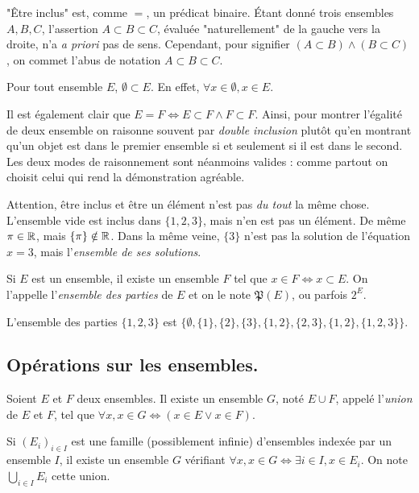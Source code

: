 "\^Etre inclus" est, comme $=$, un prédicat binaire. Étant donné trois ensembles $A, B, C$, l'assertion $A \subset B \subset C$, évaluée "naturellement" de la gauche vers la droite, n'a \emph{a priori} pas de sens. Cependant, pour signifier $(A \subset B)\wedge(B \subset C)$, on commet l'abus de notation $A \subset B \subset C$.

\begin{lined}
    Pour tout ensemble $E$, $\emptyset \subset E$. En effet, $\forall x \in \emptyset, x\in E$.
\end{lined}

Il est également clair que $E = F \Leftrightarrow E \subset F \wedge F \subset F$. Ainsi, pour montrer l'égalité de deux ensemble on raisonne souvent par  \emph{double inclusion} plutôt qu'en montrant qu'un objet est dans le premier ensemble si et seulement si il est dans le second. Les deux modes de raisonnement sont néanmoins valides : comme partout on choisit celui qui rend la démonstration agréable.

\begin{rlined}
    Attention, être inclus et être un élément n'est pas \emph{du tout} la même chose. L'ensemble vide est inclus dans $\{1, 2, 3\}$, mais n'en est pas un élément. De même $\pi \in \mathbb{R}$, mais $\{\pi\} \notin \mathbb{R}$. Dans la même veine, $\{3\}$ n'est pas la solution de l'équation $x = 3$, mais l'\emph{ensemble de ses solutions}.
\end{rlined}

\begin{ax}
    Si $E$ est un ensemble, il existe un ensemble $F$ tel que $x \in F \Leftrightarrow x \subset E$. On l'appelle l'\emph{ensemble des parties} de $E$ et on le note $\mathfrak{P}(E)$, ou parfois $2^E$.
\end{ax}

\begin{lined}
    L'ensemble des parties $\{1, 2, 3\}$ est $\{\emptyset, \{1\}, \{2\}, \{3\}, \{1, 2\}, \{2, 3\}, \{1, 2\}, \{1, 2, 3\}\}$.
\end{lined}

\subsection{Opérations sur les ensembles.}

\begin{dftn}
    Soient $E$ et $F$ deux ensembles. Il existe un ensemble $G$, noté $E \cup F$, appelé l'\emph{union} de $E$ et $F$, tel que $\forall x, x \in G \Leftrightarrow (x \in E \vee x \in F)$.
    
    Si $(E_i)_{i\in I}$ est une famille (possiblement infinie) d'ensembles indexée par un ensemble $I$, il existe un ensemble $G$ vérifiant $\forall x, x\in G \Leftrightarrow \exists i \in I, x\in E_i$. On note $\bigcup_{i\in I} E_i$ cette union.
\end{dftn}

